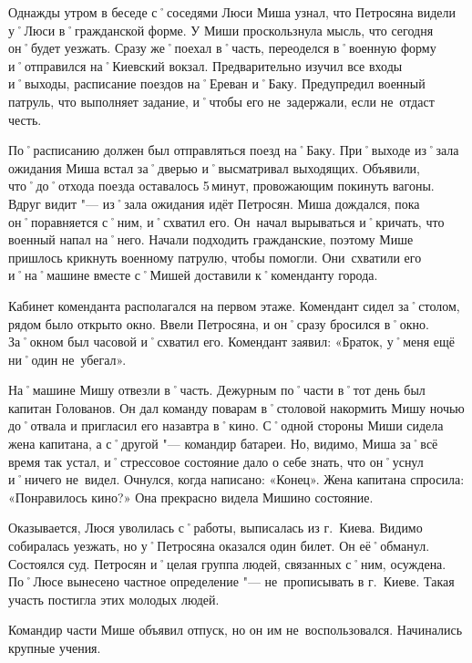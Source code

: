 Однажды утром в беседе с˚соседями Люси Миша узнал, что Петросяна видели у˚Люси в˚гражданской форме. У Миши проскользнула мысль, что сегодня он˚будет уезжать. Сразу же˚поехал в˚часть, переоделся в˚военную форму и˚отправился на˚Киевский вокзал. Предварительно изучил все входы и˚выходы, расписание поездов на˚Ереван и˚Баку. Предупредил военный патруль, что выполняет задание, и˚чтобы его не~задержали, если не~отдаст честь. 

По˚расписанию должен был отправляться поезд на˚Баку. При˚выходе из˚зала ожидания Миша встал за˚дверью и˚высматривал выходящих. Объявили, что˚до˚отхода поезда оставалось 5\,минут, провожающим покинуть вагоны. Вдруг видит "--- из˚зала ожидания идёт Петросян. Миша дождался, пока он˚поравняется с˚ним, и˚схватил его. Он~начал вырываться и˚кричать, что военный напал на˚него. Начали подходить гражданские, поэтому Мише пришлось крикнуть военному патрулю, чтобы помогли. Они~схватили его и˚на˚машине вместе с˚Мишей доставили к˚коменданту города. 

Кабинет коменданта располагался на первом этаже. Комендант сидел за˚столом, рядом было открыто окно. Ввели Петросяна, и он˚сразу бросился в˚окно. За˚окном был часовой и˚схватил его. Комендант заявил: «Браток, у˚меня ещё ни˚один не~убегал». 

На˚машине Мишу отвезли в˚часть. Дежурным по˚части в˚тот день был капитан Голованов. Он дал команду поварам в˚столовой накормить Мишу ночью до˚отвала и пригласил его назавтра в˚кино. С˚одной стороны Миши сидела жена капитана, а с˚другой "--- командир батареи. Но, видимо, Миша за˚всё время так устал, и˚стрессовое состояние дало о себе знать, что он˚уснул и˚ничего не~видел. Очнулся, когда написано: «Конец». Жена капитана спросила: «Понравилось кино?» Она прекрасно видела Мишино состояние. 

Оказывается, Люся уволилась с˚работы, выписалась из г.~Киева. Видимо собиралась уезжать, но у˚Петросяна оказался один билет. Он её˚обманул. Состоялся суд. Петросян и˚целая группа людей, связанных с˚ним, осуждена. По˚Люсе вынесено частное определение "--- не~прописывать в г.~Киеве. Такая участь постигла этих молодых людей.

Командир части Мише объявил отпуск, но он им не~воспользовался. Начинались крупные учения. 

